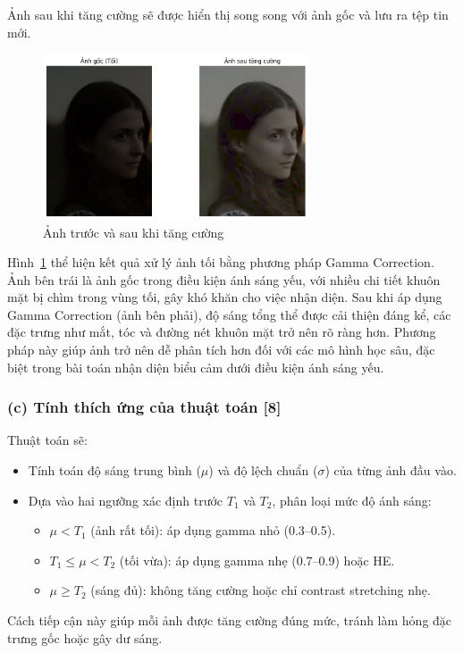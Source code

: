 Ảnh sau khi tăng cường sẽ được hiển thị song song với ảnh gốc và lưu ra tệp tin mới.


 \begin{figure}[H]
    \centering
    \includegraphics[width=0.7\textwidth]{img/anhsautangcuong.png} %
    \caption{Ảnh trước và sau khi tăng cường}
    \label{fig:emotion_distribution22}
\end{figure}

Hình~\ref{fig:emotion_distribution22} thể hiện kết quả xử lý ảnh tối bằng phương pháp Gamma Correction. Ảnh bên trái là ảnh gốc trong điều kiện ánh sáng yếu, với nhiều chi tiết khuôn mặt bị chìm trong vùng tối, gây khó khăn cho việc nhận diện. Sau khi áp dụng Gamma Correction (ảnh bên phải), độ sáng tổng thể được cải thiện đáng kể, các đặc trưng như mắt, tóc và đường nét khuôn mặt trở nên rõ ràng hơn. Phương pháp này giúp ảnh trở nên dễ phân tích hơn đối với các mô hình học sâu, đặc biệt trong bài toán nhận diện biểu cảm dưới điều kiện ánh sáng yếu.


\subsubsection*{(c) Tính thích ứng của thuật toán [8]}
Thuật toán sẽ:
\begin{itemize}[]
    \item Tính toán độ sáng trung bình ($\mu$) và độ lệch chuẩn ($\sigma$) của từng ảnh đầu vào.
    \item Dựa vào hai ngưỡng xác định trước $T_1$ và $T_2$, phân loại mức độ ánh sáng:
    \begin{itemize}[]
        \item $\mu < T_1$ (ảnh rất tối): áp dụng gamma nhỏ (0.3--0.5).
        \item $T_1 \le \mu < T_2$ (tối vừa): áp dụng gamma nhẹ (0.7--0.9) hoặc HE.
        \item $\mu \ge T_2$ (sáng đủ): không tăng cường hoặc chỉ contrast stretching nhẹ.
    \end{itemize}
\end{itemize}
Cách tiếp cận này giúp mỗi ảnh được tăng cường đúng mức, tránh làm hỏng đặc trưng gốc hoặc gây dư sáng.

